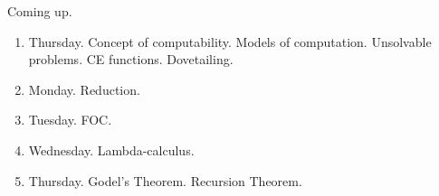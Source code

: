 \documentclass[../598comp.tex]{subfiles}
\begin{document}
Coming up. 
\begin{enumerate}
\item 
  Thursday. Concept of computability. Models of computation. Unsolvable problems. CE functions. Dovetailing.
\item
  Monday. Reduction.
\item
  Tuesday. FOC.
\item
  Wednesday. Lambda-calculus.
\item
  Thursday. Godel's Theorem. Recursion Theorem.
\end{enumerate}
\end{document}
